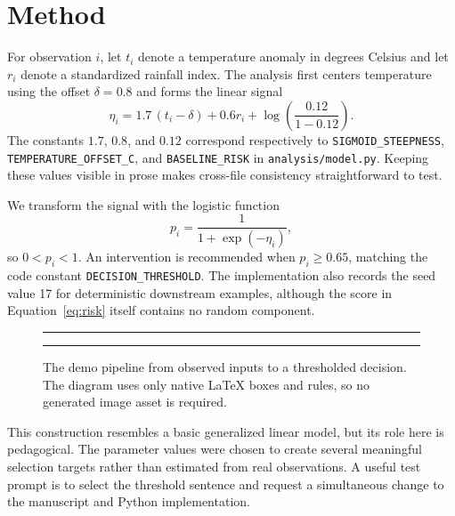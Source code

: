 \section{Method}
\label{sec:method}

For observation $i$, let $t_i$ denote a temperature anomaly in degrees Celsius
and let $r_i$ denote a standardized rainfall index.  The analysis first centers
temperature using the offset $\delta=0.8$ and forms the linear signal
\begin{equation}
  \eta_i = 1.7\,(t_i-\delta) + 0.6r_i
    + \log\!\left(\frac{0.12}{1-0.12}\right).
  \label{eq:linear}
\end{equation}
The constants $1.7$, $0.8$, and $0.12$ correspond respectively to
\texttt{SIGMOID\_\allowbreak STEEPNESS},
\texttt{TEMPERATURE\_\allowbreak OFFSET\_\allowbreak C}, and
\texttt{BASELINE\_\allowbreak RISK} in \texttt{analysis/model.py}.  Keeping
these values visible in prose makes cross-file consistency straightforward to
test.

We transform the signal with the logistic function
\begin{equation}
  p_i = \frac{1}{1+\exp(-\eta_i)},
  \label{eq:risk}
\end{equation}
so $0<p_i<1$.  An intervention is recommended when $p_i\geq 0.65$, matching
the code constant \texttt{DECISION\_\allowbreak THRESHOLD}.  The implementation
also records the seed value 17 for deterministic downstream examples, although
the score in Equation~\eqref{eq:risk} itself contains no random component.

\begin{figure}[htbp]
  \centering
  \hspace{0.03\linewidth}
  \rule[1.2ex]{0.08\linewidth}{0.5pt}
  \hspace{0.03\linewidth}
  \hspace{0.03\linewidth}
  \rule[1.2ex]{0.08\linewidth}{0.5pt}
  \hspace{0.03\linewidth}
  \caption{The demo pipeline from observed inputs to a thresholded decision.
  The diagram uses only native LaTeX boxes and rules, so no generated image
  asset is required.}
  \label{fig:pipeline}
\end{figure}

This construction resembles a basic generalized linear model, but its role here
is pedagogical.  The parameter values were chosen to create several meaningful
selection targets rather than estimated from real observations.  A useful test
prompt is to select the threshold sentence and request a simultaneous change to
the manuscript and Python implementation.
